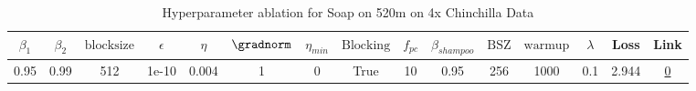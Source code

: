 \begin{table}[H]
\centering
\caption{Hyperparameter ablation for Soap on 520m on 4x Chinchilla Data}
\label{tab:ablation_soap_520m_4}
\begin{tabular}{ccccccccccccccc}
\toprule
$\beta_1$ & $\beta_2$ & $\mathrm{block size}$ & $\epsilon$ & $\eta$ & $\gradnorm$ & $\eta_{min}$ & $\mathrm{Blocking}$ & $f_{pc}$ & $\beta_{shampoo}$ & $\mathrm{BSZ}$ & $\mathrm{warmup}$ & $\lambda$ & Loss & Link \\
\midrule
0.95 & 0.99 & 512 & 1e-10 & 0.004 & 1 & 0 & True & 10 & 0.95 & 256 & 1000 & 0.1 & 2.944 & \href{https://wandb.ai/stanford-mercury/optimizer-scaling/runs/sweep-520m-42B-soapepde58c5lr0.004-wd0.1-minlr0-warmup1000-b10.9-c834a4}{0} \\
\midrule
\bottomrule
\end{tabular}
\end{table}

